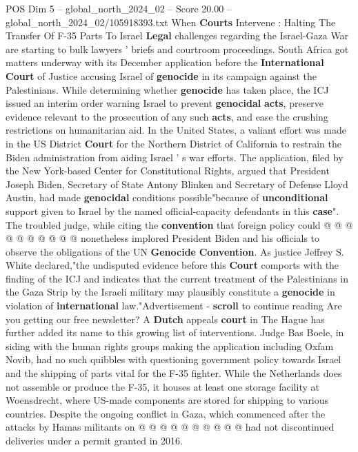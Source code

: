 \begin{textsample}{POS Dim 5 – global\_north\_2024\_02 – Score 20.00 – global\_north\_2024\_02/105918393.txt}  \label{ex:f5_pos_235}
When \textbf{Courts} Intervene : Halting The Transfer Of F-35 Parts To Israel \textbf{Legal} challenges regarding the Israel-Gaza War are starting to bulk lawyers ' briefs and courtroom proceedings.
South Africa got matters underway with its December application before the \textbf{International} \textbf{Court} of Justice accusing Israel of \textbf{genocide} in its campaign against the Palestinians.
While determining whether \textbf{genocide} has taken place, the ICJ issued an interim order warning Israel to prevent \textbf{genocidal} \textbf{acts}, preserve evidence relevant to the prosecution of any such \textbf{acts}, and ease the crushing restrictions on humanitarian aid.
In the United States, a valiant effort was made in the US District \textbf{Court} for the Northern District of California to restrain the Biden administration from aiding Israel ' s war efforts.
The application, filed by the New York-based Center for Constitutional Rights, argued that President Joseph Biden, Secretary of State Antony Blinken and Secretary of Defense Lloyd Austin, had made \textbf{genocidal} conditions possible"because of \textbf{unconditional} support given to Israel by the named official-capacity defendants in this \textbf{case}".
The troubled judge, while citing the \textbf{convention} that foreign policy could @ @ @ @ @ @ @ @ @ @ nonetheless implored President Biden and his officials to observe the obligations of the UN \textbf{Genocide} \textbf{Convention}.
As justice Jeffrey S.
White declared,"the undisputed evidence before this \textbf{Court} comports with the finding of the ICJ and indicates that the current treatment of the Palestinians in the Gaza Strip by the Israeli military may plausibly constitute a \textbf{genocide} in violation of \textbf{international} law."Advertisement - \textbf{scroll} to continue reading Are you getting our free newsletter?
A \textbf{Dutch} appeals \textbf{court} in The Hague has further added its name to this growing list of interventions.
Judge Bas Boele, in siding with the human rights groups making the application including Oxfam Novib, had no such quibbles with questioning government policy towards Israel and the shipping of parts vital for the F-35 fighter.
While the Netherlands does not assemble or produce the F-35, it houses at least one storage facility at Woensdrecht, where US-made components are stored for shipping to various countries.
Despite the ongoing conflict in Gaza, which commenced after the attacks by Hamas militants on @ @ @ @ @ @ @ @ @ @ had not discontinued deliveries under a permit granted in 2016.

\end{textsample}
